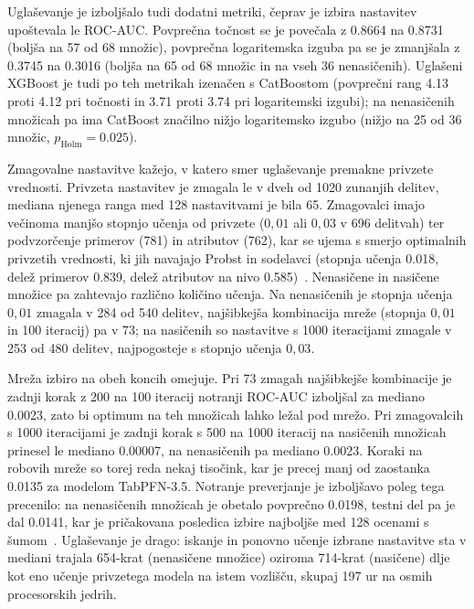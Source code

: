 \documentclass[a4paper,12pt,openright]{book}
\begin{document}


Uglaševanje je izboljšalo tudi dodatni metriki, čeprav je izbira nastavitev
upoštevala le ROC-AUC. Povprečna točnost se je povečala z \num{0.8664} na
\num{0.8731} (boljša na 57 od 68 množic), povprečna logaritemska izguba pa se je
zmanjšala z \num{0.3745} na \num{0.3016} (boljša na 65 od 68 množic in na vseh
36 nenasičenih). Uglašeni XGBoost je tudi po teh metrikah izenačen s
CatBoostom (povprečni rang \num{4.13} proti \num{4.12} pri točnosti in
\num{3.71} proti \num{3.74} pri logaritemski izgubi); na nenasičenih množicah pa
ima CatBoost značilno nižjo logaritemsko izgubo (nižjo na 25 od 36 množic,
$p_\mathrm{Holm} = \num{0.025}$).

Zmagovalne nastavitve kažejo, v katero smer uglaševanje premakne privzete
vrednosti. Privzeta nastavitev je zmagala le v dveh od 1020 zunanjih delitev,
mediana njenega ranga med 128 nastavitvami je bila 65. Zmagovalci imajo
večinoma manjšo stopnjo učenja od privzete ($0{,}01$ ali $0{,}03$ v 696
delitvah) ter podvzorčenje primerov (781) in atributov (762), kar se ujema s
smerjo optimalnih privzetih vrednosti, ki jih navajajo Probst in sodelavci
(stopnja učenja \num{0.018}, delež primerov \num{0.839}, delež atributov na
nivo \num{0.585})~\cite{probst2019tunability}. Nenasičene in nasičene množice
pa zahtevajo različno količino učenja. Na nenasičenih je stopnja učenja
$0{,}01$ zmagala v 284 od 540 delitev, najšibkejša kombinacija mreže (stopnja
$0{,}01$ in 100 iteracij) pa v 73; na nasičenih so nastavitve s 1000
iteracijami zmagale v 253 od 480 delitev, najpogosteje s stopnjo učenja
$0{,}03$.

Mreža izbiro na obeh koncih omejuje. Pri 73 zmagah najšibkejše kombinacije je
zadnji korak z 200 na 100 iteracij notranji ROC-AUC izboljšal za mediano
\num{0.0023}, zato bi optimum na teh množicah lahko ležal pod mrežo. Pri
zmagovalcih s 1000 iteracijami je zadnji korak s 500 na 1000 iteracij na nasičenih
množicah prinesel le mediano \num{0.00007}, na nenasičenih pa mediano
\num{0.0023}. Koraki na robovih mreže so torej reda nekaj tisočink, kar je
precej manj od zaostanka \num{0.0135} za modelom TabPFN-3.5. Notranje
preverjanje je izboljšavo poleg tega precenilo: na nenasičenih množicah je
obetalo povprečno \num{0.0198}, testni del pa je dal \num{0.0141}, kar je
pričakovana posledica izbire najboljše med 128 ocenami s
šumom~\cite{cawley2010over}. Uglaševanje je drago: iskanje in ponovno učenje
izbrane nastavitve sta v mediani trajala 654-krat (nenasičene množice)
oziroma 714-krat (nasičene) dlje kot eno učenje privzetega modela na istem
vozlišču, skupaj \num{197} ur na osmih procesorskih jedrih.
\end{document}
